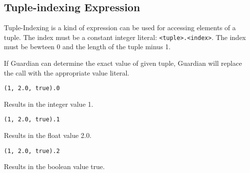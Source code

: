 
\subsection{Tuple-indexing Expression}
{
	Tuple-Indexing is a kind of expression can be used for accessing elements
	of a tuple. The index must be a constant integer
	literal: \texttt{<tuple>.<index>}.
	The index must be bewteen 0 and the length of the tuple minus 1.
	
	If Guardian can determine the exact value of given tuple, Guardian
	will replace the call with the appropriate value literal.
	
	\begin{itemize}
	{
		\item[] \texttt{(1, 2.0, true).0}
		
			Results in the integer value 1.
			
		\item[] \texttt{(1, 2.0, true).1}
		
			Results in the float value 2.0.
			
		\item[] \texttt{(1, 2.0, true).2}
		
			Results in the boolean value true.
	}
	\end{itemize}
}
